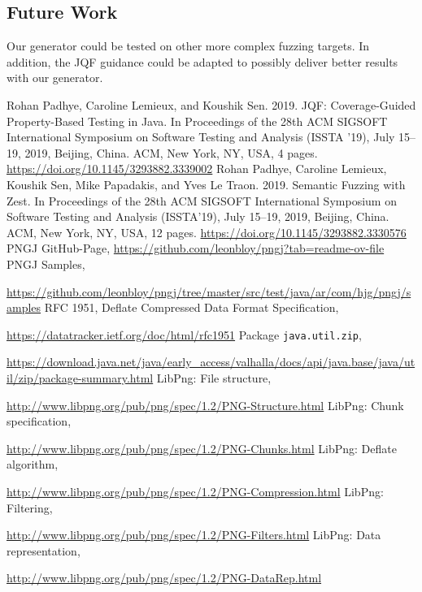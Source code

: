 \documentclass[runningheads]{llncs}
\begin{document}
\subsection{Future Work}
Our generator could be tested on other more complex fuzzing targets. In addition, the JQF guidance could be adapted to possibly deliver better results with our generator.

%
%
%
% 
% 
%
\begin{thebibliography}{8}
Rohan Padhye, Caroline Lemieux, and Koushik Sen. 2019. JQF: Coverage-Guided Property-Based Testing in Java. In Proceedings of the 28th ACM SIGSOFT International Symposium on Software Testing and Analysis (ISSTA ’19), July 15–19, 2019, Beijing, China. ACM, New York, NY, USA, 4 pages. \url{https://doi.org/10.1145/3293882.3339002}
Rohan Padhye, Caroline Lemieux, Koushik Sen, Mike Papadakis, and Yves Le Traon. 2019. Semantic Fuzzing with Zest. In Proceedings of the 28th ACM SIGSOFT International Symposium on Software Testing and Analysis (ISSTA’19), July 15–19, 2019, Beijing, China. ACM, New York, NY, USA, 12 pages. \url{https://doi.org/10.1145/3293882.3330576}
PNGJ GitHub-Page, \url{https://github.com/leonbloy/pngj?tab=readme-ov-file}
PNGJ Samples, 

\url{https://github.com/leonbloy/pngj/tree/master/src/test/java/ar/com/hjg/pngj/samples}
RFC 1951, Deflate Compressed Data Format Specification,

\url{https://datatracker.ietf.org/doc/html/rfc1951}
Package \texttt{java.util.zip},

\url{https://download.java.net/java/early\_access/valhalla/docs/api/java.base/java/util/zip/package-summary.html}
LibPng: File structure,

\url{http://www.libpng.org/pub/png/spec/1.2/PNG-Structure.html}
LibPng: Chunk specification, 

\url{http://www.libpng.org/pub/png/spec/1.2/PNG-Chunks.html}
LibPng: Deflate algorithm,

\url{http://www.libpng.org/pub/png/spec/1.2/PNG-Compression.html}
LibPng: Filtering,

\url{http://www.libpng.org/pub/png/spec/1.2/PNG-Filters.html}
LibPng: Data representation,

\url{http://www.libpng.org/pub/png/spec/1.2/PNG-DataRep.html}
\end{thebibliography}
\end{document}
